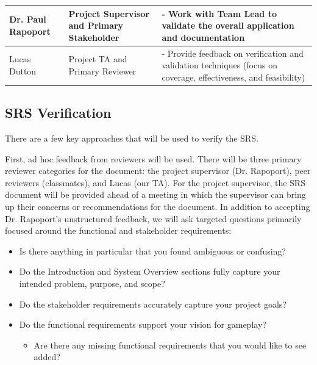 \documentclass[12pt, titlepage]{article}
\renewcommand{\wss}[1]{}
\begin{document}
\begin{tabularx}{\linewidth}{|Y|Y|Y|}
    \hline

    Dr. Paul Rapoport &
    Project Supervisor and Primary Stakeholder &
    - Work with Team Lead to validate the overall application and documentation \\

    \hline

    Lucas Dutton &
    Project TA and Primary Reviewer &
    - Provide feedback on verification and validation techniques (focus on coverage, effectiveness, and feasibility) \\

\end{tabularx}

\subsection{SRS Verification}

\wss{List any approaches you intend to use for SRS verification.  This may
  include ad hoc feedback from reviewers, like your classmates (like your
  primary reviewer), or you may plan for something more rigorous/systematic.}

\wss{If you have a supervisor for the project, you shouldn't just say they will
read over the SRS.  You should explain your structured approach to the review.
Will you have a meeting?  What will you present?  What questions will you ask?
Will you give them instructions for a task-based inspection?  Will you use your
issue tracker?}

\wss{Maybe create an SRS checklist?}

There are a few key approaches that will be used to verify the SRS.

First, ad hoc feedback from reviewers will be used. There will be three primary reviewer categories for the document: the project supervisor (Dr. Rapoport), peer reviewers (classmates), and Lucas (our TA). For the project supervisor, the SRS document will be provided ahead of a meeting in which the supervisor can bring up their concerns or recommendations for the document. In addition to accepting Dr. Rapoport's unstructured feedback, we will ask targeted questions primarily focused around the functional and stakeholder requirements:

\begin{itemize}
  \item Is there anything in particular that you found ambiguous or confusing?
  \item Do the Introduction and System Overview sections fully capture your intended problem, purpose, and scope?
  \item Do the stakeholder requirements accurately capture your project goals?
  \item Do the functional requirements support your vision for gameplay?
  \begin{itemize}
    \item Are there any missing functional requirements that you would like to see added?
  \end{itemize}
\end{itemize}
\end{document}
